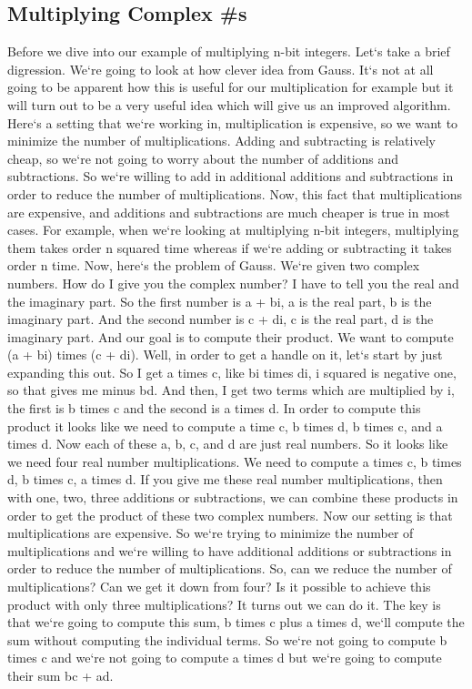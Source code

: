 \subsection{Multiplying Complex \#s}
Before we dive into our example of multiplying n-bit integers.
Let`s take a brief digression.
We`re going to look at how clever idea from Gauss.
It`s not at all going to be apparent how this is useful for our multiplication for example but it will turn out to be a very useful idea which will give us an improved algorithm.
Here`s a setting that we`re working in, multiplication is expensive, so we want to minimize the number of multiplications.
Adding and subtracting is relatively cheap, so we`re not going to worry about the number of additions and subtractions.
So we`re willing to add in additional additions and subtractions in order to reduce the number of multiplications.
Now, this fact that multiplications are expensive, and additions and subtractions are much cheaper is true in most cases.
For example, when we`re looking at multiplying n-bit integers, multiplying them takes order n squared time whereas if we`re adding or subtracting it takes order n time.
Now, here`s the problem of Gauss.
We`re given two complex numbers.
How do I give you the complex number? I have to tell you the real and the imaginary part.
So the first number is a + bi, a is the real part, b is the imaginary part.
And the second number is c + di, c is the real part, d is the imaginary part.
And our goal is to compute their product.
We want to compute (a + bi) times (c + di).
Well, in order to get a handle on it, let`s start by just expanding this out.
So I get a times c, like bi times di, i squared is negative one, so that gives me minus bd.
And then, I get two terms which are multiplied by i, the first is b times c and the second is a times d.
In order to compute this product it looks like we need to compute a time c, b times d, b times c, and a times d.
Now each of these a, b, c, and d are just real numbers.
So it looks like we need four real number multiplications.
We need to compute a times c, b times d, b times c, a times d.
If you give me these real number multiplications, then with one, two, three additions or subtractions, we can combine these products in order to get the product of these two complex numbers.
Now our setting is that multiplications are expensive.
So we`re trying to minimize the number of multiplications and we`re willing to have additional additions or subtractions in order to reduce the number of multiplications.
So, can we reduce the number of multiplications? Can we get it down from four? Is it possible to achieve this product with only three multiplications? It turns out we can do it.
The key is that we`re going to compute this sum, b times c plus a times d, we`ll compute the sum without computing the individual terms.
So we`re not going to compute b times c and we`re not going to compute a times d but we`re going to compute their sum bc + ad.

